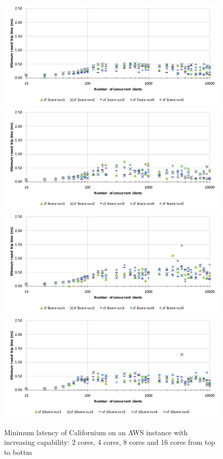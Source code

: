 \begin{figure}[!htbp]
\centering
\includegraphics[scale=0.6]{cf_min_latency_2cores}
\includegraphics[scale=0.6]{cf_min_latency_4cores}
\includegraphics[scale=0.6]{cf_min_latency_8cores}
\includegraphics[scale=0.6]{cf_min_latency_16cores}
\caption[Minimum latency of Californium on an AWS instance with increasing capability]{Minimum latency of Californium on an AWS instance with increasing capability: 2 cores, 4 cores, 8 cores and 16 cores from top to bottm}
\label{fig:cf_min_latency}
\end{figure}

